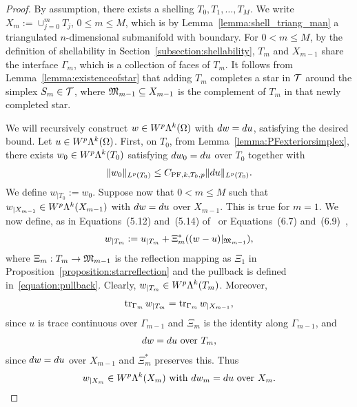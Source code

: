 \documentclass[10pt,a4paper]{article}
\begin{document}
\begin{proof}
    By assumption, there exists a shelling $T_0, T_1, \dots, T_{M}$. 
    We write $X_m := \cup_{j=0}^{m} T_j$, $0 \leq m \leq M$, 
    which is by Lemma~\ref{lemma:shell_triang_man} a triangulated $n$-dimensional submanifold with boundary. 
    For $0 < m \leq M$, by the definition of shellability in Section~\ref{subsection:shellability}, 
    $T_{m}$ and $X_{m-1}$ share the interface $\Gamma_{m}$, which is a collection of faces of $T_{m}$. 
    It follows from Lemma~\ref{lemma:existenceofstar} that adding $T_{m}$ completes a star in ${\mathcal T}$ around the simplex $S_{m} \in {\mathcal T}$, 
    where ${\mathfrak M}_{m-1} \subseteq X_{m-1}$ is the complement of $T_{m}$ in that newly completed star. 
    
    We will recursively construct $w \in W^{p}\Lambda^{k}(\Omega)$ with $d w = d u$, satisfying the desired bound. 
    Let $u \in W^{p}\Lambda^{k}(\Omega)$. 
    First, on $T_0$, from Lemma~\ref{lemma:PFexteriorsimplex}, 
    there exists $w_0 \in W^{p}\Lambda^{k}(T_{0})$ satisfying $d w_0 = d u$ over $T_{0}$ together with 
    \begin{gather*}
        \| w_0 \|_{L^{p}(T_{0})} \leq C_{{{\rm PF}},k,T_{0},p} \| d u \|_{L^{p}(T_{0})}.
    \end{gather*}
    We define $w_{|T_0} := w_0$. 
    Suppose now that $0 < m \leq M$ such that $w_{|X_{m-1}} \in W^{p}\Lambda^{k}(X_{m-1})$ with $d w = d u$ over $X_{m-1}$. 
    This is true for $m = 1$. 
    We now define, as in Equations~(5.12) and~(5.14) of~\cite{ern2020stable} or Equations~(6.7) and~(6.9)~\cite{Chaum_Voh_p_rob_3D_H_curl_24},
    \begin{align} \label{equation:w''_ext_der}
        w_{|T_m} := u_{|T_m} + \Xi_{m}^{\ast}((w - u)|_{{\mathfrak M}_{m-1}}),
    \end{align}
    where $\Xi_{m} : T_{m} \rightarrow {\mathfrak M}_{m-1}$ is the reflection mapping
    as $\Xi_{1}$ in Proposition~\ref{proposition:starreflection} and the pullback is defined in~\eqref{equation:pullback}.
    Clearly, $w_{|T_m} \in W^{p}\Lambda^{k}(T_{m})$. Moreover,
    \begin{align*}
        \operatorname{tr}_{\Gamma_{m}} w_{|T_m} = \operatorname{tr}_{\Gamma_{m}} w_{|X_{m-1}},
    \end{align*}
    since $u$ is trace continuous over $\Gamma_{m-1}$ and $\Xi_{m}$ is the identity along $\Gamma_{m-1}$, and
    \begin{align*}
        d w = d u \text{ over } T_m,
    \end{align*}
    since $d w = d u$ over $X_{m-1}$ and $\Xi_{m}^{\ast}$ preserves this. Thus
    \begin{align*}
        w_{|X_{m}} \in W^{p}\Lambda^{k}(X_{m}) \text{ with } d w_{m} = d u \text{ over } X_{m}. 
    \end{align*}
    

\end{proof}
\end{document}
